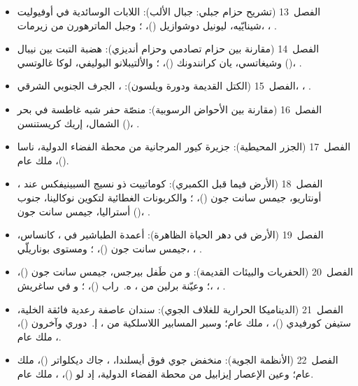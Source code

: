 \begin{itemize}
  \item الفصل~13 (تشريح حزام جبلي: جبال الألب): اللابات الوسائدية في أوفيوليت شينايّيه، ليونيل دوشوازيل ()، ؛ وجبل الماترهورن من زيرمات، ، .
  \item الفصل~14 (مقارنة بين حزام تصادمي وحزام أنديزي): هضبة التبت بين نيبال وشيغاتسي، يان كرانندونك ()، ؛ والألتيبلانو البوليفي، لوكا غالوتسي ()، .
  \item الفصل~15 (الكتل القديمة ودورة ويلسون): ، الجرف الجنوبي الشرقي، ، .
  \item الفصل~16 (مقارنة بين الأحواض الرسوبية): منصّة حفر شبه غاطسة في بحر الشمال، إريك كريستنسن ()، .
  \item الفصل~17 (الجزر المحيطية): جزيرة كيور المرجانية من محطة الفضاء الدولية، ناسا ()، ملك عام.
  \item الفصل~18 (الأرض فيما قبل الكمبري): كوماتييت ذو نسيج السبينيفكس عند ، أونتاريو، جيمس سانت جون ()، ؛ والكربونات الغطائية لتكوين نوكالينا، جنوب أستراليا، جيمس سانت جون ()، .
  \item الفصل~19 (الأرض في دهر الحياة الظاهرة): أعمدة الطباشير في ، كانساس، جيمس سانت جون ()، ؛ ومستوى بوناريلّي، ، .
  \item الفصل~20 (الحفريات والبيئات القديمة):  و من طَفل بيرجس، جيمس سانت جون ()، ؛ وعيّنة برلين من ، ه.~راب ()، ؛ و في ساغريش، ، .
  \item الفصل~21 (الديناميكا الحرارية للغلاف الجوي): سندان عاصفة رعدية فائقة الخلية، ستيفن كورفيدي ()، ، ملك عام؛ وسبر المسابير اللاسلكية من ، إ.~دوري وآخرون ()، ، ملك عام.
  \item الفصل~22 (الأنظمة الجوية): منخفض جوي فوق أيسلندا، ، جاك ديكلواتر ()، ملك عام؛ وعين الإعصار إيزابيل من محطة الفضاء الدولية، إد لو ()، ، ملك عام.

\end{itemize}
